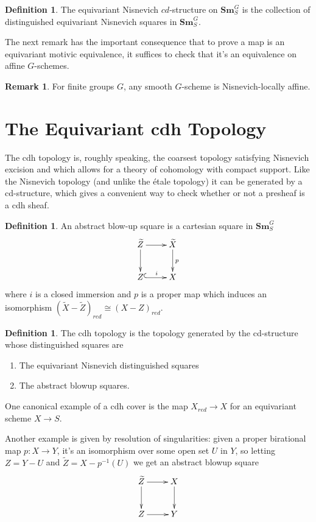 \documentclass[edeposit,fullpage]{uiucthesis2009}
\newcommand{\Sm}[1]{\mathbf{Sm}_{#1}}
\theoremstyle{plain}
\numberwithin{lemma}{section}
\theoremstyle{definition}
\newtheorem{definition}[lemma]{Definition}
\newtheorem{remark}[lemma]{Remark}
\begin{document}
\begin{definition}
The equivariant Nisnevich $cd$-structure on $\Sm{S}^G$ is the
collection of distinguished equivariant Nisnevich squares in $\Sm{S}^G$.
\end{definition}

The next remark has the important consequence that to prove a map is
an equivariant motivic equivalence, it suffices to check that it's an
equivalence on affine $G$-schemes. 

\begin{remark}
For finite groups $G$, any smooth $G$-scheme is Nisnevich-locally
affine. 
\end{remark}

\section{The Equivariant cdh Topology}

The cdh topology is, roughly speaking, the coarsest topology
satisfying Nisnevich excision and which allows for a theory of
cohomology with compact support. Like the Nisnevich topology (and
unlike the \'etale topology) it can be generated by a cd-structure,
which gives a convenient way to check whether or not a presheaf is a
cdh sheaf. 

\begin{definition}\label{def:cdh_top}
An abstract blow-up square is a cartesian square in $\Sm{S}^G$
\[
\xymatrix{\widetilde Z \ar[r]\ar[d] & \widetilde X \ar[d]^p \\ Z \ar@{^{(}->}[r]^i & X}
\]
where $i$ is a closed immersion and $p$ is a proper map which induces
an isomorphism $(\widetilde X - \widetilde Z)_{red} \cong (X-Z)_{red}$.
\end{definition}

\begin{definition}
The cdh topology is the topology generated by the cd-structure whose
distinguished squares are
\begin{enumerate}
\item The equivariant Nisnevich distinguished squares
\item The abstract blowup squares.
\end{enumerate}
\end{definition}

One canonical example of a cdh cover is the map $X_{red} \rightarrow
X$ for an equivariant scheme $X \rightarrow S$.

Another example is given by resolution of singularities: given a
proper birational map $p : X \rightarrow Y$, it's an isomorphism over
some open set $U$ in $Y$, so letting $Z = Y-U$ and $\widetilde Z = X -
p^{-1}(U)$ we get an abstract blowup square
\[
\xymatrix{\widetilde Z \ar[r] \ar[d] & X \ar[d] \\ Z \ar[r] & Y}
\]
\end{document}
